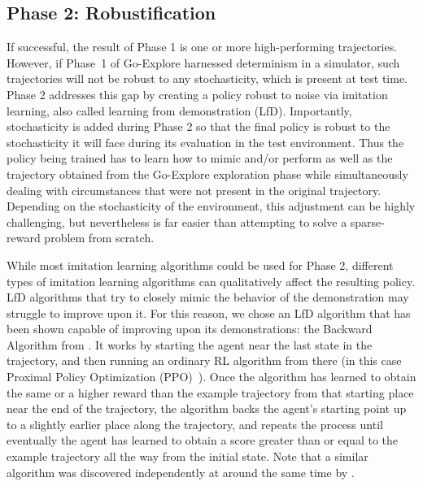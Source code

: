 \documentclass{article}
\begin{document}
\subsection{Phase 2: Robustification}
\label{sec:robustification}

If successful, the result of Phase 1 is one or more high-performing trajectories. However, if Phase~1 of Go-Explore harnessed determinism in a simulator, such trajectories will not be robust to any stochasticity, which is present at test time. Phase 2 addresses this gap by creating a policy robust to noise via imitation learning, also called learning from demonstration (LfD). Importantly, stochasticity is added during Phase 2 so that the final policy is robust to the stochasticity it will face during its evaluation in the test environment. 
Thus the policy being trained has to learn how to mimic and/or perform as well as the trajectory obtained from the Go-Explore exploration phase while simultaneously dealing with circumstances that were not present in the original trajectory. Depending on the stochasticity of the environment, this adjustment can be highly challenging, but nevertheless is far easier than attempting to solve a sparse-reward problem from scratch.

While most imitation learning algorithms could be used for Phase 2, different types of imitation learning algorithms can qualitatively affect the resulting policy. LfD algorithms that try to closely mimic the behavior of the demonstration may struggle to improve upon it. For this reason, we chose an LfD algorithm that has been shown capable of improving upon its demonstrations: the Backward Algorithm from \citet{salimans2018learning}. It works by starting the agent near the last state in the trajectory, and then running an ordinary RL algorithm from there (in this case Proximal Policy Optimization (PPO)~\cite{Schulman2017ProximalPO}). Once the algorithm has learned to obtain the same or a higher reward than the example trajectory from that starting place near the end of the trajectory, the algorithm backs the agent's starting point up to a slightly earlier place along the trajectory, and repeats the process until eventually the agent has learned to obtain a score greater than or equal to the example trajectory all the way from the initial state. Note that a similar algorithm was discovered independently at around the same time by \citet{Resnick2018BackplayM}.
\end{document}
